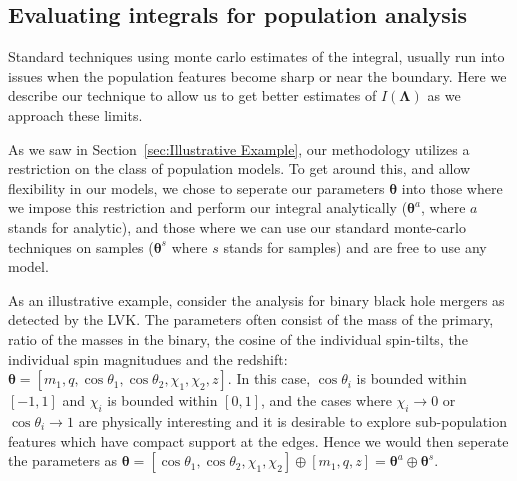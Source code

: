 \documentclass[twocolumn,usenames,dvipsnames,linenumbers]{aastex631}
\newcommand{\btheta}{\boldsymbol{\theta}}
\newcommand{\bLambda}{\boldsymbol{\Lambda}}
\begin{document}
\subsection{Evaluating integrals for population analysis}
Standard techniques using monte carlo estimates of the integral, usually run into issues when the population features become sharp or near the boundary. Here we describe our technique to allow us to get better estimates of $I(\bLambda)$ as we approach these limits. 

As we saw in Section~\ref{sec:Illustrative Example}, our methodology utilizes a restriction on the class of population models. To get around this, and allow flexibility in our models, we chose to seperate our parameters $\btheta$ into those where we impose this restriction and perform our integral analytically ($\btheta^a$, where $a$ stands for analytic), and those where we can use our standard monte-carlo techniques on samples ($\btheta^s$ where $s$ stands for samples) and are free to use any model.


As an illustrative example, consider the analysis for binary black hole mergers as detected by the LVK. The parameters often consist of the mass of the primary, ratio of the masses in the binary, the cosine of the individual spin-tilts, the individual spin magnitudues and the redshift: $\btheta = [m_1, q, \cos\theta_1, \cos\theta_2, \chi_1, \chi_2, z]$. In this case, $\cos\theta_i$ is bounded within $[-1,1]$ and $\chi_i$ is bounded within $[0,1]$, and the cases where $\chi_i \to 0$ or $\cos\theta_i \to 1$ are physically interesting and it is desirable to explore sub-population features which have compact support at the edges. Hence we would then seperate the parameters as $\btheta = [\cos\theta_1, \cos\theta_2, \chi_1, \chi_2]\oplus[m_1, q, z] = \btheta^a\oplus\btheta^s $.
\end{document}
